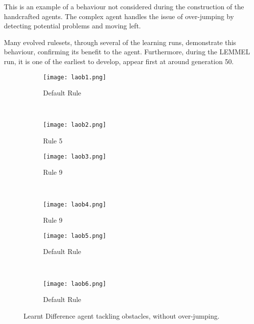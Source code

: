 This is an example of a behaviour not considered during the construction of the handcrafted agents. The complex agent handles the issue of over-jumping by detecting potential problems and moving left.

Many evolved rulesets, through several of the learning runs, demonstrate this behaviour, confirming its benefit to the agent. Furthermore, during the LEMMEL run, it is one of the earliest to develop, appear first at around generation 50.

\clearpage

\begin{figure}[m]
	\begin{adjustwidth}{-2cm}{-2cm}
    \centering
          \begin{subfigure}[b]{0.49\textwidth}
                  \centering
                  \texttt{[image: laob1.png]}
                  \caption{Default Rule}
                  \vspace*{\baselineskip}
          \end{subfigure}~
          \begin{subfigure}[b]{0.49\textwidth}
                  \centering
                  \texttt{[image: laob2.png]}
                  \caption{Rule 5}
                  \vspace*{\baselineskip}
          \end{subfigure}
          \begin{subfigure}[b]{0.49\textwidth}
                  \centering
                  \texttt{[image: laob3.png]}
                  \caption{Rule 9}
                  \vspace*{\baselineskip}
          \end{subfigure}~
          \begin{subfigure}[b]{0.49\textwidth}
                  \centering
                  \texttt{[image: laob4.png]}
                  \caption{Rule 9}
                  \vspace*{\baselineskip}
          \end{subfigure}
          \begin{subfigure}[b]{0.49\textwidth}
                  \centering
                  \texttt{[image: laob5.png]}
                  \caption{Default Rule}
                  \vspace*{\baselineskip}
          \end{subfigure}~
          \begin{subfigure}[b]{0.49\textwidth}
                  \centering
                  \texttt{[image: laob6.png]}
                  \caption{Default Rule}
                  \vspace*{\baselineskip}
          \end{subfigure}
    \caption{Learnt Difference agent tackling obstacles, without over-jumping.}\label{fig:laob}
    \end{adjustwidth}
\end{figure}


